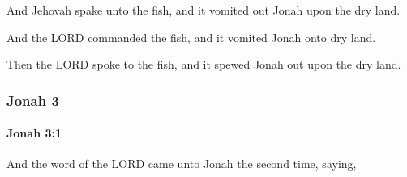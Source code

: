 			\begin{versebox}
					\item[BHS] 
					\item[LXX] 
					\item[ASV] And Jehovah spake unto the fish, and it vomited out Jonah upon the dry land.
					\item[NIV] And the LORD commanded the fish, and it vomited Jonah onto dry land.
					\item[NRSV] Then the LORD spoke to the fish, and it spewed Jonah out upon the dry land.
			\end{versebox}
	\subsubsection{Jonah 3} %
		\label{JONAH-3}

		\paragraph{Jonah 3:1} %
			\label{JONAH-3-1}

			And the word of the LORD came unto Jonah the second time, saying,

